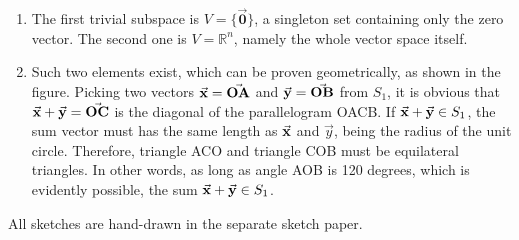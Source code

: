 \documentclass{article}
\begin{document}
\begin{enumerate}
\item The first trivial subspace is $V = \{\vec{\mathbf{0}}\}$, a singleton set containing only the zero vector. The second one is $V = \mathbb{R}^n$, namely the whole vector space itself.

\item Such two elements exist, which can be proven geometrically, as shown in the figure. Picking two vectors $\vec{\mathbf{x}} = \vec{\mathbf{OA}}$ and $\vec{\mathbf{y}} = \vec{\mathbf{OB}}$ from $S_1$, it is obvious that $\vec{\mathbf{x}} + \vec{\mathbf{y}} = \vec{\mathbf{OC}}$ is the diagonal of the parallelogram OACB. If $\vec{\mathbf{x}} + \vec{\mathbf{y}} \in S_1$, the sum vector must has the same length as $\vec{\mathbf{x}}$ and $\vec{y}$, being the radius of the unit circle. Therefore, triangle ACO and triangle COB must be equilateral triangles. In other words, as long as angle AOB is 120 degrees, which is evidently possible, the sum $\vec{\mathbf{x}} + \vec{\mathbf{y}} \in S_1$. \QED

\begin{figure}[h]
\begin{center}
\end{center}
\end{figure}
\end{enumerate}

All sketches are hand-drawn in the separate sketch paper.

\end{document}
